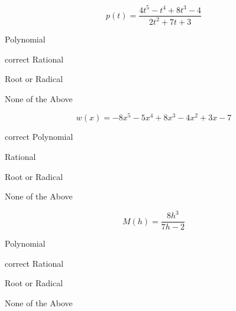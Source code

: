 \documentclass{ximera}
\begin{document}
\begin{exercise}
\begin{question}
\end{question}








\begin{question}


\[
p(t) = \frac{4t^5 - t^4 + 8t^3 - 4}{2t^2 + 7t + 3}
\]

\begin{multipleChoice}
\item {Polynomial}
\item [correct]{Rational}
\item {Root or Radical}
\item {None of the Above}
\end{multipleChoice}


\end{question}












\begin{question}


\[
w(x) = -8x^5 - 5x^4 + 8x^3 - 4x^2 + 3x - 7
\]

\begin{multipleChoice}
\item [correct]{Polynomial}
\item {Rational}
\item {Root or Radical}
\item {None of the Above}
\end{multipleChoice}


\end{question}











\begin{question}


\[
M(h) = \frac{ 8h^3}{7h - 2}
\]

\begin{multipleChoice}
\item {Polynomial}
\item [correct]{Rational}
\item {Root or Radical}
\item {None of the Above}
\end{multipleChoice}


\end{question}











\end{exercise}
\end{document}
